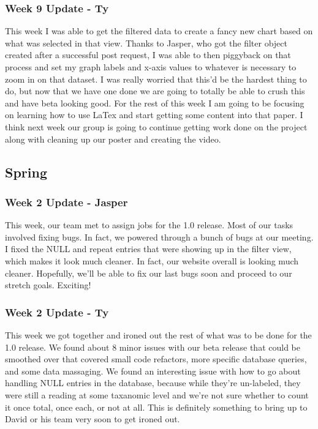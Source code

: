 \subsubsection{Week 9 Update - Ty}
This week I was able to get the filtered data to create a fancy new chart based on what was selected in that view.
Thanks to Jasper, who got the filter object created after a successful post request, I was able to then piggyback on that process and set my graph labels and x-axis values to whatever is necessary to zoom in on that dataset.
I was really worried that this'd be the hardest thing to do, but now that we have one done we are going to totally be able to crush this and have beta looking good.
For the rest of this week I am going to be focusing on learning how to use LaTex and start getting some content into that paper.
I think next week​ our group is going to continue getting work done on the project along with cleaning up our poster and creating the video.

\subsection{Spring}

\subsubsection{Week 2 Update - Jasper}
This week, our team met to assign jobs for the 1.0 release.
Most of our tasks involved fixing bugs.
In fact, we powered through a bunch of bugs at our meeting.
I fixed ​the NULL and repeat entries that were showing up in the filter view, which makes it look much cleaner.
In fact, our website overall is looking much cleaner.
Hopefully, we'll be able to fix our last bugs soon and proceed to our stretch goals.
Exciting!

\subsubsection{Week 2 Update - Ty}
This week we got together and ironed out the rest of what was to be done for the 1.0 release.
We found about 8 minor issues with our beta release that could be smoothed over that covered small code refactors, more specific database queries, and some data massaging.
We found an interesting issue with how to go about handling NULL entries in the database, because while they're un-labeled, they were still a reading at some taxanomic level and we're not sure whether to count it once total, once each, or not at all.
This is definitely something to bring up to David or his team very soon to get ironed out. ​

